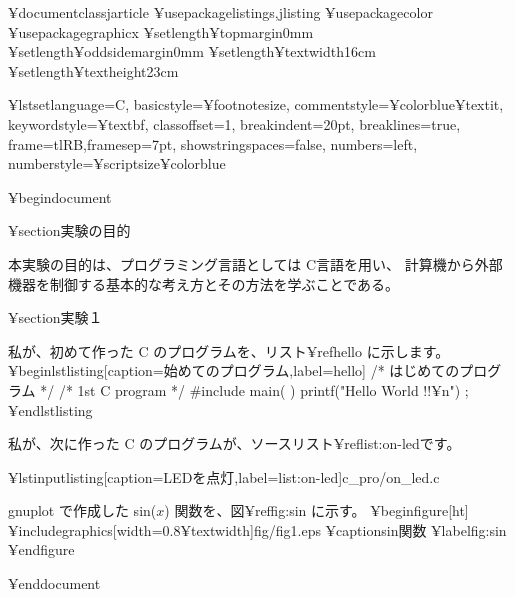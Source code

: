 ¥documentclass{jarticle}
¥usepackage{listings,jlisting}  %
¥usepackage{color}              %
¥usepackage{graphicx}           %
¥setlength{¥topmargin}{0mm}
¥setlength{¥oddsidemargin}{0mm}
¥setlength{¥textwidth}{16cm}
¥setlength{¥textheight}{23cm}

¥lstset{language=C,%
        basicstyle=¥footnotesize,%
        commentstyle=¥color{blue}¥textit,%
        keywordstyle=¥textbf,%
        classoffset=1,%
        breakindent=20pt,%
        breaklines=true,%
        frame=tlRB,framesep=7pt,%
        showstringspaces=false,%
        numbers=left,%
        numberstyle=¥scriptsize¥color{blue}%
        }%

¥begin{document}

¥section{実験の目的}

本実験の目的は、プログラミング言語としては C言語を用い、
計算機から外部機器を制御する基本的な考え方とその方法を学ぶことである。

¥section{実験１}

私が、初めて作った C のプログラムを、リスト¥ref{hello} に示します。
¥begin{lstlisting}[caption=始めてのプログラム,label=hello]
/* はじめてのプログラム */
/* 1st C program */
#include
main( )
{
    printf("Hello World !!¥n") ;
}
¥end{lstlisting}

私が、次に作った C のプログラムが、ソースリスト¥ref{list:on-led}です。

¥lstinputlisting[caption=LEDを点灯,label=list:on-led]{c_pro/on_led.c}

gnuplot で作成した sin($x$) 関数を、図¥ref{fig:sin} に示す。
¥begin{figure}[ht]
¥includegraphics[width=0.8¥textwidth]{fig/fig1.eps}
¥caption{sin関数}
¥label{fig:sin}
¥end{figure}

¥end{document}
